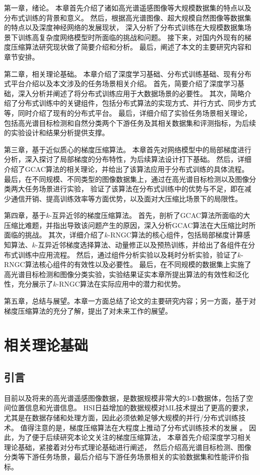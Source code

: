 \documentclass{xdupgthesis}
\begin{document}
第一章，绪论。
本章首先介绍了诸如高光谱遥感图像等大规模数据集的特点以及分布式训练的背景和意义。
然后，根据高光谱图像、超大规模自然图像等数据集的特点以及深度神经网络的发展现状，
深入分析了分布式训练在大规模数据集场景下训练高复杂度网络模型时所面临的挑战和问题。
接下来，对国内外现有的梯度压缩算法研究现状做了简要介绍和分析。
最后，阐述了本文的主要研究内容和章节安排。

第二章，相关理论基础。
本章介绍了深度学习基础、分布式训练基础、现有分布式平台介绍以及本文涉及的任务场景相关介绍。
首先，简要介绍了深度学习基础，深入分析并阐述了将分布式训练应用于大数据场景的必要性。
其次，简略介绍了分布式训练中的关键组件，包括分布式算法的实现方式、并行方式、同步方式等，同时介绍了现有的分布式平台。
最后，详细介绍了实验任务场景相关理论，包括高光谱目标检测和自然分类两个下游任务及其相关数据集和评测指标，为后续的实验设计和结果分析提供支撑。

第三章，基于近似质心的梯度压缩算法。
本章首先对网络模型中的局部梯度进行分析，深入探讨了局部梯度的分布特性，为后续算法设计打下基础。
然后，详细介绍了GCAC算法的相关理论，并给出了该算法应用于分布式训练的具体流程。
最后，在不同规模、不同类型的图像数据集上，通过在高光谱目标检测以及图像分类两大任务场景进行实验，
验证了该算法在分布式训练中的优势与不足，即在减少通信开销、提高训练效率等方面优势，以及面对大压缩比场景下的局限性。

第四章，基于$k$-互异近邻的梯度压缩算法。
首先，剖析了GCAC算法所面临的大压缩比难题，并指出导致该问题产生的原因，深入分析GCAC算法在大压缩比时所面临的挑战。
其次，详细介绍了$k$-RNGC算法的核心组件，包括局部梯度计算感知算法、$k$-互异近邻梯度选择算法、动量修正以及预热训练，并给出了各组件在分布式训练中应用流程。
然后，通过组件分析实验以及耗时分析实验，验证了$k$-RNGC算法核心组件的有效性以及必要性。
最后，在不同规模的数据集上实施了高光谱目标检测和图像分类实验，实验结果证实本章所提出算法的有效性和泛化性，充分展示了$k$-RNGC算法在实际应用中的潜力和优势。

第五章，总结与展望。本章一方面总结了论文的主要研究内容；另一方面，基于对梯度压缩算法的充分了解，提出了对未来工作的展望。


\chapter{相关理论基础}
\label{sec_chapter-2}
\section{引言}
目前以及将来的高光谱遥感图像数据，是数据规模非常大的3$\textbf{-}$D数据体，包括了空间位置信息和光谱信息。
HSI日益增加的数据规模对ML技术提出了更高的要求，尤其是在数据存储和处理方面，因此必须依赖足够大规模的并行/分布式训练技术。
值得注意的是，梯度压缩算法在大程度上推动了分布式训练技术的发展 \cite{song2021communication} \cite{ghosh2021communication} \cite{zhang2020communication} \cite{khirirat2020compressed}。
因此，为了便于后续研究本论文关注的梯度压缩算法，
本章首先介绍深度学习相关理论基础，紧接着对分布式理论基础进行阐述，
然后介绍高光谱目标检测、图像分类等下游任务场景，最后介绍与下游任务场景相关的实验数据集和性能评价指标。
\end{document}
